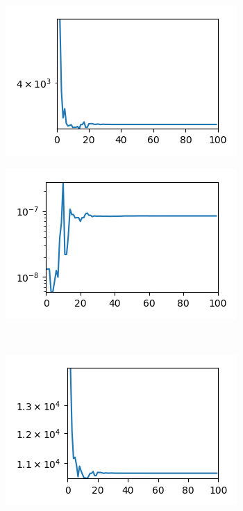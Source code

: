 \documentclass{llncs}
\begin{document}
	\begin{figure}[!h]                                                                                  
		\centering                                                                                      
		\begin{subfigure}{0.5\textwidth}
			\centering
			\includegraphics[scale=0.7]{ContinuoLibre/cc-r1}
			\caption{}
			\label{fig:F-r1}
		\end{subfigure}%
		\begin{subfigure}{0.5\textwidth}
			\centering
			\includegraphics[scale=0.7]{ContinuoLibre/cc-c4}
			\caption{}
			\label{fig:F-c4}
		\end{subfigure}   \\                                                         
		\begin{subfigure}{0.5\textwidth}
			\centering
			\includegraphics[scale=0.7]{ContinuoLibre/cc-r2}

\end{subfigure}
\end{figure}
\end{document}
